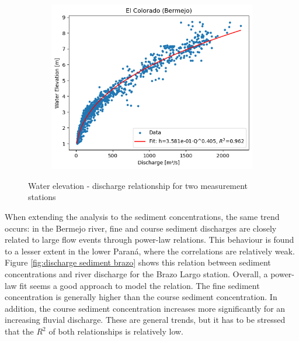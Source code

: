 \begin{figure}[h!]
\begin{subfigure}[b]{0.48\linewidth}
        \includegraphics[width=\linewidth]{figures/ch5/wl discharge El Colorado.png}
        \label{fig:water level discharge Colorado}
    \end{subfigure}
    \caption{Water elevation - discharge relationship for two measurement stations}
    \label{fig:waterleveldischarge}
\end{figure}

When extending the analysis to the sediment concentrations, the same trend occurs: in the Bermejo river, fine and course sediment discharges are closely related to large flow events through power-law relations. This behaviour is found to a lesser extent in the lower Paraná, where the correlations are relatively weak. Figure \ref{fig:discharge sediment brazo} shows this relation between sediment concentrations and river discharge for the Brazo Largo station. Overall, a power-law fit seems a good approach to model the relation. The fine sediment concentration is generally higher than the course sediment concentration. In addition, the course sediment concentration increases more significantly for an increasing fluvial discharge. These are general trends, but it has to be stressed that the $R^2$ of both relationships is relatively low.  


